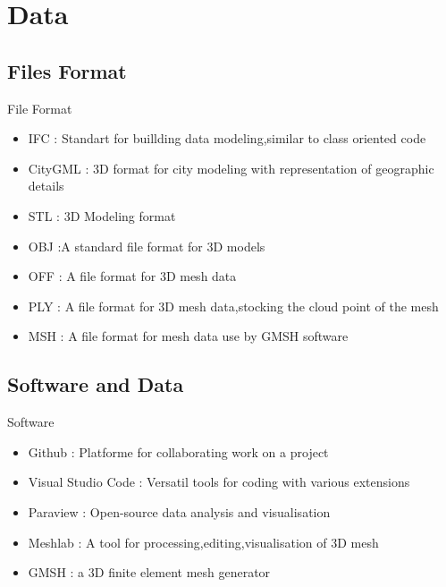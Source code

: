 \documentclass[10pt]{beamer}
\begin{document}
\section{Data}
\subsection{Files Format}
\begin{frame}{File Format}
\begin{itemize}
    \item IFC : Standart for buillding data modeling,similar to class oriented code
    \item CityGML : 3D format for city modeling with representation of geographic details
    \item STL : 3D Modeling format 
    \item OBJ :A standard file format for 3D models
    \item OFF :  A file format for 3D mesh data
    \item PLY :  A file format for 3D mesh data,stocking the cloud point of the mesh 
    \item MSH : A file format for mesh data use by GMSH software
\end{itemize}
\end{frame}

\subsection{Software and Data}
\begin{frame}{Software}
    \begin{itemize}
        \item Github : Platforme for collaborating work on a project
        \item Visual Studio Code : Versatil tools for coding with various extensions
        \item Paraview : Open-source data analysis and visualisation
        \item Meshlab : A tool for processing,editing,visualisation of 3D mesh
        \item GMSH : a 3D finite element mesh generator
    \end{itemize}

\end{frame}
\end{document}

